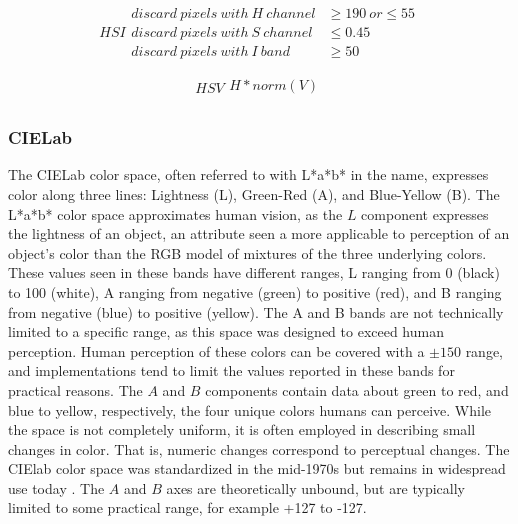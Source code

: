 \documentclass[letterpaper]{report}
\begin{document}
{\begin{equation}\label{eqn:index-hsi}
	HSI
    \begin{split}
		discard~pixels~with~H~channel &\geq 190~or \leq 55\\
		discard~pixels~with~S~channel &\leq 0.45 \\
		discard~pixels~with~I~band &\geq 50
    \end{split}
\end{equation}

\begin{equation}\label{eqn:index-hsv}
	HSV
	\begin{split}
		H * norm(V) \\
	\end{split}
\end{equation}

\subsubsection{CIELab}
The CIELab color space, often referred to with L*a*b* in the name, expresses color along three lines: Lightness (L), Green-Red (A), and Blue-Yellow (B). The L*a*b* color space approximates human vision, as the $L$ component expresses  the lightness of an object, an attribute seen a more applicable to perception of an object's color than the RGB model of mixtures of the three underlying colors.  These values seen in these bands have different ranges, L ranging from 0 (black) to 100 (white), A ranging from negative (green) to positive (red), and B ranging from negative (blue) to positive (yellow). The A and B bands are not technically limited to a specific range, as this space was designed to exceed human perception. Human perception of these colors can be covered with a $\pm 150$ range, and implementations tend to limit the values reported in these bands for practical reasons.  The $A$ and $B$ components contain data about green to red, and blue to yellow, respectively, the four unique colors humans can perceive. While the space is not completely uniform, it is often employed in describing small changes in color. That is, numeric changes correspond to perceptual changes. The CIElab color space was standardized in the mid-1970s but remains in widespread use today \cite{Leilich2023-lf}.  The $A$ and $B$ axes are theoretically unbound, but are typically limited to some practical range, for example +127 to -127. 

}
\end{document}
